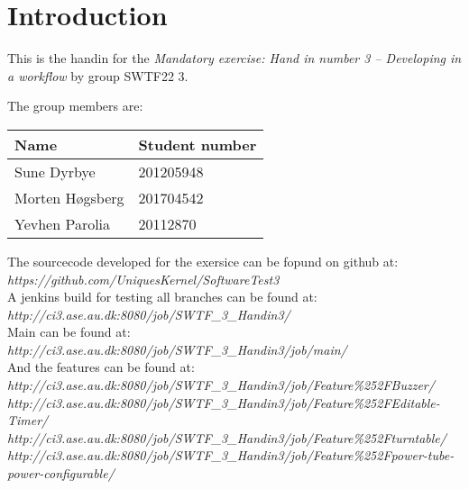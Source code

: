 \section{Introduction}

This is the handin for the \textit{Mandatory exercise: Hand in number 3 – Developing in a workflow} by group SWTF22 3.

The group members are:

\begin{table}[h]
\centering
\begin{tabular}{|l|l|}
\hline
Name & Student number\\
\hline
Sune Dyrbye & 201205948\\
Morten Høgsberg & 201704542 \\
Yevhen Parolia & 20112870\\
\hline
\end{tabular}
\end{table}

The sourcecode developed for the exersice can be fopund on github at:\\ 
\textit{https://github.com/UniquesKernel/SoftwareTest3} \\

A jenkins build for testing all branches can be found at:\\
\textit{http://ci3.ase.au.dk:8080/job/SWTF\_3\_Handin3/}\\
Main can be found at: \\
\textit{http://ci3.ase.au.dk:8080/job/SWTF\_3\_Handin3/job/main/}\\
And the features can be found at:\\
\textit{http://ci3.ase.au.dk:8080/job/SWTF\_3\_Handin3/job/Feature\%252FBuzzer/}\\
\textit{http://ci3.ase.au.dk:8080/job/SWTF\_3\_Handin3/job/Feature\%252FEditable-Timer/}\\
\textit{http://ci3.ase.au.dk:8080/job/SWTF\_3\_Handin3/job/Feature\%252Fturntable/}\\
\textit{http://ci3.ase.au.dk:8080/job/SWTF\_3\_Handin3/job/Feature\%252Fpower-tube-power-configurable/}




\newpage
